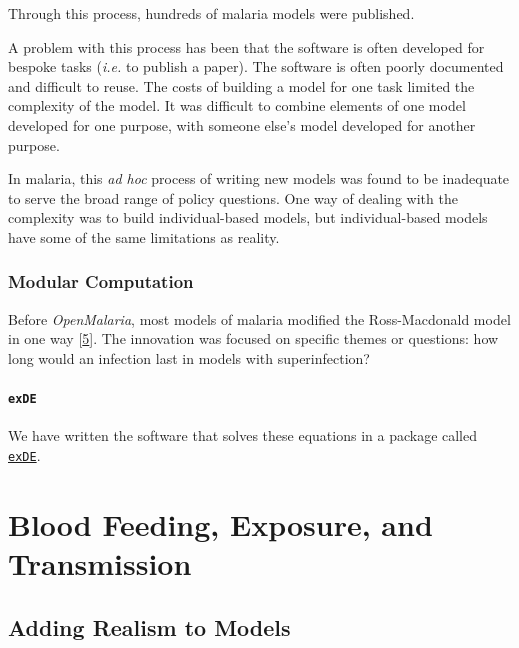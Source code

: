 \documentclass[
]{book}
\begin{document}
Through this process, hundreds of malaria models were published.

A problem with this process has been that the software is often developed for bespoke tasks (\emph{i.e.} to publish a paper). The software is often poorly documented and difficult to reuse. The costs of building a model for one task limited the complexity of the model. It was difficult to combine elements of one model developed for one purpose, with someone else's model developed for another purpose.

In malaria, this \emph{ad hoc} process of writing new models was found to be inadequate to serve the broad range of policy questions. One way of dealing with the complexity was to build individual-based models, but individual-based models have some of the same limitations as reality.

\hypertarget{modular-computation}{%
\section{Modular Computation}\label{modular-computation}}

Before \emph{OpenMalaria}, most models of malaria modified the Ross-Macdonald model in one way {[}\protect\hyperlink{ref-ReinerRCJ2013SystematicReview}{5}{]}. The innovation was focused on specific themes or questions: how long would an infection last in models with superinfection?

\hypertarget{exde}{%
\subsection{\texorpdfstring{\texttt{exDE}}{exDE}}\label{exde}}

We have written the software that solves these equations in a package called \href{https://cran.r-project.org/web/packages/exDE/index.html}{\texttt{exDE}}.

\hypertarget{part-blood-feeding-exposure-and-transmission}{%
\part{Blood Feeding, Exposure, and Transmission}\label{part-blood-feeding-exposure-and-transmission}}

\hypertarget{adding-realism-to-models}{%
\chapter{Adding Realism to Models}\label{adding-realism-to-models}}
\end{document}
